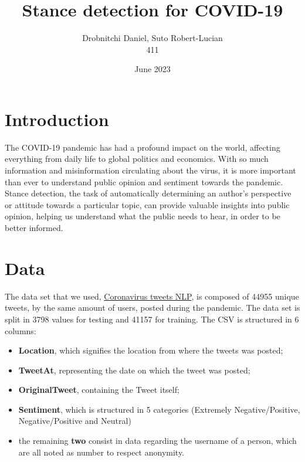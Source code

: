 \documentclass[11pt, a4paper]{article}
\title{Stance detection for COVID-19}
\author{ Drobnitchi Daniel, Suto Robert-Lucian \\411}
\date{June 2023}
\begin{document}
\maketitle
\begin{large}

\section{Introduction}

The COVID-19 pandemic has had a profound impact on the world, affecting everything from daily life to global politics and economics. With so much information and misinformation circulating about the virus, it is more important than ever to understand public opinion and sentiment towards the pandemic. Stance detection, the task of automatically determining an author’s perspective or attitude towards a particular topic, can provide valuable insights into public opinion, helping us understand what the public needs to hear, in order to be better informed.

\section{Data}
The data set that we used, \href{https://www.kaggle.com/datasets/datatattle/covid-19-nlp-text-classification?select=Corona_NLP_test.csv}{Coronavirus tweets NLP}, is composed of 44955 unique tweets, by the same amount of users, posted during the pandemic. The data set is split in 3798 values for testing and 41157 for training. The CSV is structured in 6 columns:
\begin{itemize}
    \item \textbf{Location}, which signifies the location from where the tweets was posted;
    \item \textbf{TweetAt}, representing the date on which the tweet was posted;
    \item \textbf{OriginalTweet}, containing the Tweet itself; 
    \item \textbf{Sentiment}, which is structured in 5 categories (Extremely Negative/Positive, Negative/Positive and Neutral)
    \item the remaining \textbf{two} consist in data regarding the username of a person, which are all noted as number to respect anonymity.
\end{itemize}


\end{large}
\end{document}
